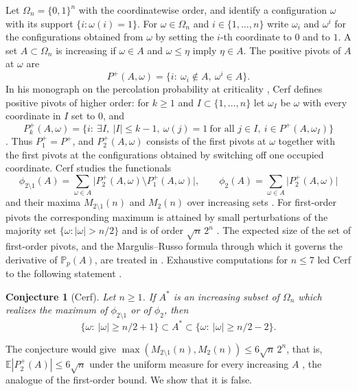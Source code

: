\documentclass[11pt]{amsart}
\newtheorem{conjecture}[theorem]{Conjecture}
\theoremstyle{definition}
\theoremstyle{remark}
\numberwithin{equation}{section}
\newcommand{\Pp}{\mathbb P}
\newcommand{\E}{\mathbb E}
\begin{document}
Let $\Omega_n=\{0,1\}^n$ with the coordinatewise order, and identify a configuration $\omega$ with its support $\{i:\omega(i)=1\}$. For $\omega\in\Omega_n$ and $i\in\{1,\dots,n\}$ write $\omega_i$ and $\omega^i$ for the configurations obtained from $\omega$ by setting the $i$-th coordinate to $0$ and to $1$. A set $A\subset\Omega_n$ is increasing if $\omega\in A$ and $\omega\le\eta$ imply $\eta\in A$. The positive pivots of $A$ at $\omega$ are
\[
P^+(A,\omega)=\{i:\ \omega_i\notin A,\ \omega^i\in A\}.
\]
In his monograph on the percolation probability at criticality \cite{C}, Cerf defines positive pivots of higher order: for $k\ge1$ and $I\subset\{1,\dots,n\}$ let $\omega_I$ be $\omega$ with every coordinate in $I$ set to $0$, and
\begin{equation}\label{eq:Pk}
P_k^+(A,\omega)=\bigl\{i:\ \exists I,\ |I|\le k-1,\ \omega(j)=1\ \text{for all } j\in I,\ i\in P^+(A,\omega_I)\bigr\}
\end{equation}
\cite[(49.1)]{C}. Thus $P_1^+=P^+$, and $P_2^+(A,\omega)$ consists of the first pivots at $\omega$ together with the first pivots at the configurations obtained by switching off one occupied coordinate. Cerf studies the functionals
\[
\phi_{2\setminus1}(A)=\sum_{\omega\in A}\bigl|P_2^+(A,\omega)\setminus P_1^+(A,\omega)\bigr|,\qquad
\phi_2(A)=\sum_{\omega\in A}\bigl|P_2^+(A,\omega)\bigr|
\]
and their maxima $M_{2\setminus1}(n)$ and $M_2(n)$ over increasing sets \cite[(51.1), (52.1)]{C}. For first-order pivots the corresponding maximum is attained by small perturbations of the majority set $\{\omega:|\omega|>n/2\}$ and is of order $\sqrt n\,2^n$ \cite[\S50]{C}. The expected size of the set of first-order pivots, and the Margulis--Russo formula \cite{R} through which it governs the derivative of $\Pp_p(A)$, are treated in \cite{C25}. Exhaustive computations for $n\le7$ led Cerf to the following statement \cite[Conjecture~53.1]{C}.

\begin{conjecture}[Cerf]\label{conj}
Let $n\ge1$. If $A^*$ is an increasing subset of $\Omega_n$ which realizes the maximum of $\phi_{2\setminus1}$ or of $\phi_2$, then
\[
\{\omega:\ |\omega|\ge n/2+1\}\subset A^*\subset\{\omega:\ |\omega|\ge n/2-2\}.
\]
\end{conjecture}

The conjecture would give $\max(M_{2\setminus1}(n),M_2(n))\le 6\sqrt n\,2^n$, that is, $\E|P_2^+(A)|\le6\sqrt n$ under the uniform measure for every increasing $A$ \cite[(53.2)]{C}, the analogue of the first-order bound. We show that it is false.
\end{document}
